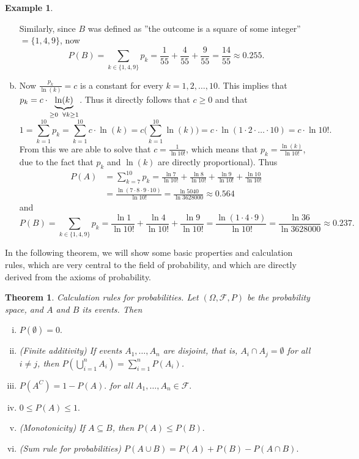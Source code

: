 \documentclass[12pt,a4paper,leqno]{report}
\newcommand{\F}{\mathcal{F}}
\theoremstyle{plain}
\newtheorem{lause}[equation]{Theorem}
\theoremstyle{definition}
\newtheorem{esim}[equation]{Example}
\begin{document}
\begin{esim}
\begin{enumerate}[(a)]
Similarly, since $B$ was defined as  ''the outcome is a square of some integer'' $= \{1, 4, 9\}$, now 
\[
P(B) = \sum_{k \in \{1,4,9\}} p_k = \frac{1}{55} + \frac{4}{55} + \frac{9}{55} = \frac{14}{55} \approx 0.255. 
\]
\item Now $\frac{p_k}{\ln(k)} = c$ is a constant for every $k = 1,2, \ldots, 10$. This implies that  $p_k = c \cdot \underbrace{\ln(k)}_{\geq 0 \enskip \forall k \geq 1}$. Thus it directly follows that $c \geq 0$ and that 
\[
1 = \sum_{k = 1}^{10} p_k = \sum_{k = 1}^{10} c \cdot \ln(k) = c \big( \sum_{k = 1}^{10} \ln(k) \big) = c \cdot \ln(1 \cdot 2 \cdot \ldots \cdot 10) = c \cdot \ln10!.
\]
From this we are able to solve that $c = \frac{1}{\ln10!}$, which means that $p_k = \frac{\ln(k)}{\ln10 !}$, due to the fact that $p_k$ and  $\ln(k)$ are directly proportional). Thus 
\[
\begin{split}
P(A) &= \sum_{k = 7}^{10}p_k = \frac{\ln7}{\ln10!} + \frac{\ln8}{\ln10!} + \frac{\ln9}{\ln10!} + \frac{\ln10}{\ln10!} \\
&= \frac{\ln(7 \cdot 8 \cdot 9 \cdot 10)}{\ln10!} = \frac{\ln5040}{\ln3628000} \approx 0.564
\end{split}
\]
and
\[
P(B) = \sum_{k \in \{1,4,9\}} p_k = \frac{\ln1}{\ln10!} + \frac{\ln4}{\ln10!} + \frac{\ln9}{\ln10!} = \frac{\ln(1 \cdot 4 \cdot 9)}{\ln10!} = \frac{\ln36}{\ln3628000} \approx 0.237. 
\]
\end{enumerate}
\end{esim}

\bigskip

In the following theorem, we will show some basic properties and calculation rules, which are very central to the field of probability, and which are directly derived from the axioms of probability.

\begin{lause}\label{lause:prob_axiom_followups}
Calculation rules for probabilities. Let $(\Omega, \F, P)$ be the probability space, and $A$ and $B$ its events. Then 
\begin{enumerate}[(i)]
	\item $P(\emptyset) = 0.$
	\item (Finite additivity) If events $A_1, \dots, A_n$ are disjoint, that is, $A_i \cap A_j = \emptyset$ for all $i \neq j$, then $P(\bigcup_{i=1}^n A_i) = \sum_{i=1}^n P(A_i)$. 
	\item $P(A^C) = 1 - P(A).$
	for all $A_1, \dots , A_n \in \F.$
	\item $0 \leq P(A) \leq 1.$
	\item (Monotonicity) If $A \subseteq B$, then $P(A) \leq P(B).$
	\item (Sum rule for probabilities) $P(A \cup B) = P(A) + P(B) - P(A \cap B).$
\end{enumerate}
\end{lause}
\end{document}
